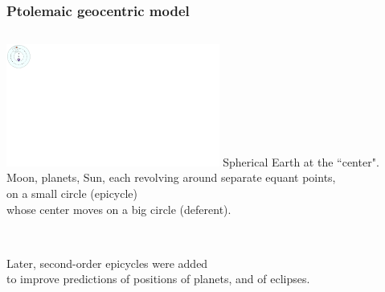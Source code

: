 \documentclass[aspectratio=169,xcolor=pdftex,dvipsnames]{beamer} %
\begin{document}
\begin{frame}
\frametitle{Ptolemaic geocentric model}

\begin{columns}
        
      \includegraphics[width=70mm]{geocentric.pdf}
           Spherical Earth at the ``center".\\
           Moon, planets, Sun, each
           revolving around separate equant points,\\
           on a small  circle (epicycle)\\
           whose center moves on a big circle (deferent). 
\end{columns} 
\ \\
Later, second-order epicycles were added\\
to improve predictions of positions of planets, and of eclipses.

\end{frame}


\end{document}
